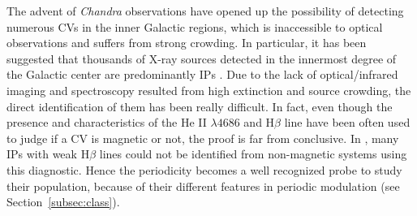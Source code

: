 \documentclass[fleqn,usenatbib]{mnras}
\begin{document}
The advent of {\it Chandra} observations have opened up the possibility of detecting numerous CVs in the inner Galactic regions, which is inaccessible to optical observations and suffers from strong crowding. 
In particular, it has been suggested that thousands of X-ray sources detected in the innermost degree of the Galactic center are predominantly IPs \citep{2009ApJS..181..110M,2018ApJS..235...26Z}. Due to the lack of optical/infrared imaging and spectroscopy resulted from high extinction and source crowding, the direct identification of them has been really difficult.
In fact, even though the presence and characteristics of the He II $\lambda 4686$ and H$\beta$ line have been often used to judge if a CV is magnetic or not, the proof is far from conclusive. In \cite{1992PhDT.......119S}, many IPs with weak H$\beta$ lines could not be identified from non-magnetic systems using this diagnostic. 
Hence the periodicity becomes a well recognized probe to study their population, because of their different features in periodic modulation (see Section~\ref{subsec:class}). 



\end{document}
